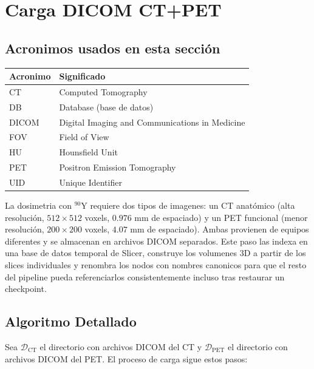 \documentclass[12pt,a4paper]{article}
\begin{document}
\section{Carga DICOM CT+PET}
\label{sec:carga}

\subsection*{Acronimos usados en esta sección}
\begin{tabular}{ll}
\toprule
\textbf{Acronimo} & \textbf{Significado} \\
\midrule
CT & Computed Tomography \\
DB & Database (base de datos) \\
DICOM & Digital Imaging and Communications in Medicine \\
FOV & Field of View \\
HU & Hounsfield Unit \\
PET & Positron Emission Tomography \\
UID & Unique Identifier \\
\bottomrule
\end{tabular}

La dosimetria con $^{90}$Y requiere dos tipos de imagenes: un CT anatómico (alta resolución,
$512\times512$ voxels, $0.976$ mm de espaciado) y un PET funcional (menor resolución,
$200\times200$ voxels, $4.07$ mm de espaciado). Ambas provienen de equipos diferentes y se
almacenan en archivos DICOM separados. Este paso las indexa en una base de datos temporal de
Slicer, construye los volumenes 3D a partir de los slices individuales y renombra los nodos con
nombres canonicos para que el resto del pipeline pueda referenciarlos consistentemente incluso
tras restaurar un checkpoint.

\subsection{Algoritmo Detallado}

Sea $\mathcal{D}_{\text{CT}}$ el directorio con archivos DICOM del CT
y $\mathcal{D}_{\text{PET}}$ el directorio con archivos DICOM del PET.
El proceso de carga sigue estos pasos:
\end{document}
